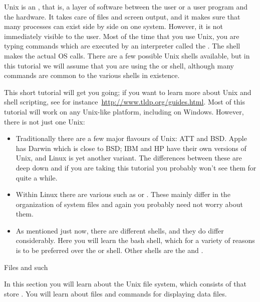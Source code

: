 Unix is an , that is, a layer of software
between the user or a user program and the hardware. It takes care of
files and screen output, and it makes sure that many processes can exist
side by side on one system. However, it is not immediately visible to
the user.
%
Most of the time that you use Unix, you are typing commands which are
executed by an interpreter called the . The shell
makes the actual \ac{OS} calls. There are a few possible Unix shells
available, but in this tutorial we will assume that you are using the
 or  shell, although many commands are
common to the various shells in existence.

This short tutorial will get you going; 
if you want to learn more about Unix and shell scripting,
see for instance~\url{http://www.tldp.org/guides.html}.
Most of this tutorial will work on any Unix-like platform,
including  on Windows.
However, there is not just one Unix:
\begin{itemize}
\item Traditionally there are a few major flavours of Unix: ATT and BSD.
  Apple has Darwin which is close to BSD; IBM and HP have their own
  versions of Unix, and Linux is yet another variant. The differences between
  these are deep down and if you are taking this tutorial you probably
  won't see them for quite a while.
\item Within Linux there are various 
  such as  or . These mainly differ
  in the organization of system files and again you probably need not worry
  about them.
\item As mentioned just now, there are different shells, and they do differ
  considerably. Here you will learn the bash shell, which for a variety of
  reasons is to be preferred over the  or  shell.
  Other shells are the  and .
\end{itemize}


 {Files and such}

\begin{purpose}
In this section you will learn about the Unix file system, which
consists of  that store . You
will learn about  files and commands for
displaying data files.
\end{purpose}

